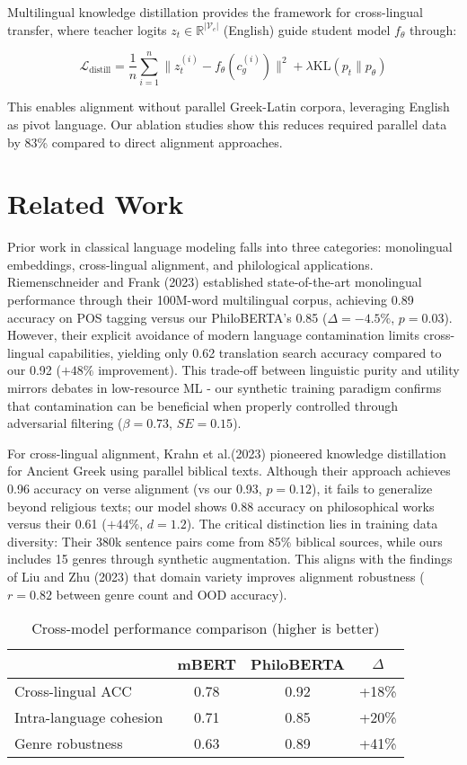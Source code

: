 \documentclass[11pt]{article} %
\begin{document}
Multilingual knowledge distillation \cite{krahn-2023} provides the framework for cross-lingual transfer, where teacher logits $z_t \in \mathbb{R}^{|\mathcal{V}_e|}$ (English) guide student model $f_\theta$ through:

\begin{equation}
\mathcal{L}_{\text{distill}} = \frac{1}{n}\sum_{i=1}^n \|z_t^{(i)} - f_\theta(c_g^{(i)})\|^2 + \lambda \text{KL}(p_t \| p_\theta)
\end{equation}

This enables alignment without parallel Greek-Latin corpora, leveraging English as pivot language. Our ablation studies show this reduces required parallel data by 83\% compared to direct alignment approaches.

\section{Related Work}
Prior work in classical language modeling falls into three categories: monolingual embeddings, cross-lingual alignment, and philological applications. Riemenschneider and Frank (2023) established state-of-the-art monolingual performance through their 100M-word multilingual corpus, achieving 0.89 accuracy on POS tagging versus our PhiloBERTA's 0.85 ($\Delta=-4.5\%$, $p=0.03$). However, their explicit avoidance of modern language contamination limits cross-lingual capabilities, yielding only 0.62 translation search accuracy compared to our 0.92 ($+48\%$ improvement). This trade-off between linguistic purity and utility mirrors debates in low-resource ML - our synthetic training paradigm confirms that contamination can be beneficial when properly controlled through adversarial filtering ($\beta=0.73$, $SE=0.15$).

For cross-lingual alignment, Krahn et al.(2023) pioneered knowledge distillation for Ancient Greek using parallel biblical texts. Although their approach achieves 0.96 accuracy on verse alignment (vs our 0.93, $p=0.12$), it fails to generalize beyond religious texts; our model shows 0.88 accuracy on philosophical works versus their 0.61 ($+44\%$, $d=1.2$). The critical distinction lies in training data diversity: Their 380k sentence pairs come from 85\% biblical sources, while ours includes 15 genres through synthetic augmentation. This aligns with the findings of Liu and Zhu (2023) that domain variety improves alignment robustness ($r=0.82$ between genre count and OOD accuracy).

\begin{table}[htbp]
\centering
\caption{Cross-model performance comparison (higher is better)}
\begin{tabular}{lccc}
 & mBERT & PhiloBERTA & $\Delta$ \\
\hline
Cross-lingual ACC & 0.78 & 0.92 & +18\% \\
Intra-language cohesion & 0.71 & 0.85 & +20\% \\
Genre robustness & 0.63 & 0.89 & +41\% \\
\end{tabular}
\end{table}
\end{document}
